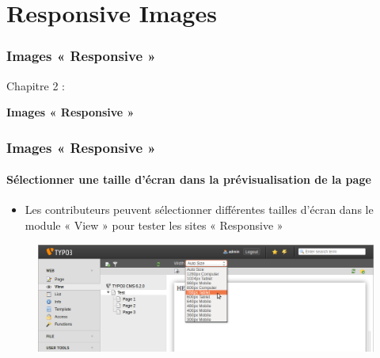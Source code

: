 %

\section{Responsive Images}
\begin{frame}[fragile]
	\frametitle{Images « Responsive »}

	\begin{center}\huge{Chapitre 2 :}\end{center}
	\begin{center}\huge{\color{typo3darkgrey}\textbf{Images « Responsive »}}\end{center}

\end{frame}


\begin{frame}[fragile]
	\frametitle{Images « Responsive »}
	\framesubtitle{Sélectionner une taille d'écran dans la prévisualisation de la page}

	\begin{itemize}
		\item Les contributeurs peuvent sélectionner différentes tailles d'écran dans le module « View » pour tester les sites « Responsive »
	\end{itemize}

	\begin{figure}
		\includegraphics[width=0.95\linewidth]{Images/ResponsiveImages/ScreenSizeInPagePreview.png}
	\end{figure}

\end{frame}

